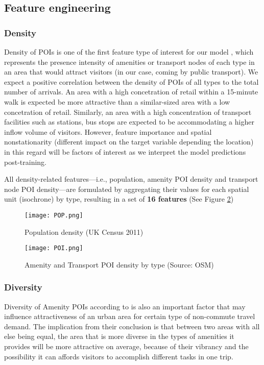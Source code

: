 \subsection{Feature engineering}
\subsubsection*{Density}

Density of POIs is one of the first feature type of interest for our model \citep{cerveroTravelDemand3Ds1997}, which represents the presence intensity of amenities or transport nodes of each type in an area that would attract visitors (in our case, coming by public transport). We expect a positive correlation between the density of POIs of all types to the total number of arrivals. An area with a high concetration of retail within a 15-minute walk is expected be more attractive than a similar-sized area with a low concetration of retail. Similarly, an area with a high concentration of transport facilities such as stations, bus stops are expected to be accommodating a higher inflow volume of visitors. However, feature importance and spatial nonstationarity (different impact on the target variable depending  the location) in this regard will be factors of interest as we interpret the model predictions post-training.

All density-related features---i.e., population, amenity POI density and transport node POI density---are formulated by aggregating their values for each spatial unit (isochrone) by type, resulting in a set of \textbf{16 features} (See Figure \ref{fig:poi})

\begin{figure}
    \centering
    \texttt{[image: POP.png]}
    \caption{Population density (UK Census 2011)}
    \label{fig:pop}
\end{figure}

\begin{figure}
    \centering
    \texttt{[image: POI.png]}
    \caption{Amenity and Transport POI density by type (Source: OSM)}
    \label{fig:poi}
\end{figure}

\subsubsection*{Diversity}

Diversity of Amenity POIs according to \citet{cerveroTravelDemand3Ds1997} is also an important factor that may influence attractiveness of an urban area for certain type of non-commute travel demand. The implication from their conclusion is that between two areas with all else being equal, the area that is more diverse in the types of amenities it provides will be more attractive on average, because of their vibrancy and the possibility it can affords visitors to accomplish different tasks in one trip.

